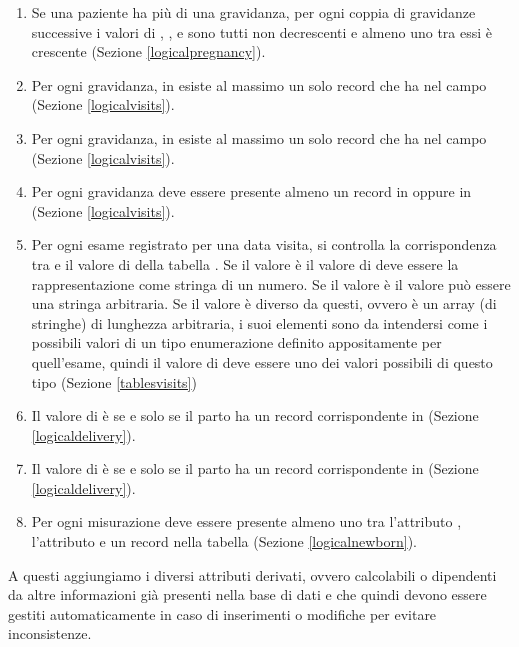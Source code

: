 \begin{enumerate}
\item Se una paziente ha più di una gravidanza, per ogni coppia di gravidanze successive i valori di , ,  e  sono tutti non decrescenti e almeno uno tra essi è crescente (Sezione \ref{logicalpregnancy}).
\item Per ogni gravidanza, in  esiste al massimo un solo record che ha  nel campo  (Sezione \ref{logicalvisits}).
\item Per ogni gravidanza, in  esiste al massimo un solo record che ha  nel campo  (Sezione \ref{logicalvisits}).
\item Per ogni gravidanza deve essere presente almeno un record in  oppure in  (Sezione \ref{logicalvisits}).
\item Per ogni esame registrato per una data visita, si controlla la corrispondenza tra  e il valore di  della tabella . Se il valore è  il valore di  deve essere la rappresentazione come stringa di un numero. Se il valore è  il valore può essere una stringa arbitraria. Se il valore è diverso da questi, ovvero è un array (di stringhe) di lunghezza arbitraria, i suoi elementi sono da intendersi come i possibili valori di un tipo enumerazione definito appositamente per quell'esame, quindi il valore di  deve essere uno dei valori possibili di questo tipo (Sezione \ref{tablesvisits})
\item Il valore di  è  se e solo se il parto ha un record corrispondente in  (Sezione \ref{logicaldelivery}).
\item Il valore di  è  se e solo se il parto ha un record corrispondente in  (Sezione \ref{logicaldelivery}).
\item Per ogni misurazione deve essere presente almeno uno tra l'attributo , l'attributo  e un record nella tabella  (Sezione \ref{logicalnewborn}).
\end{enumerate}

A questi aggiungiamo i diversi attributi derivati, ovvero calcolabili o dipendenti da altre informazioni già presenti nella base di dati e che quindi devono essere gestiti automaticamente in caso di inserimenti o modifiche per evitare inconsistenze.

